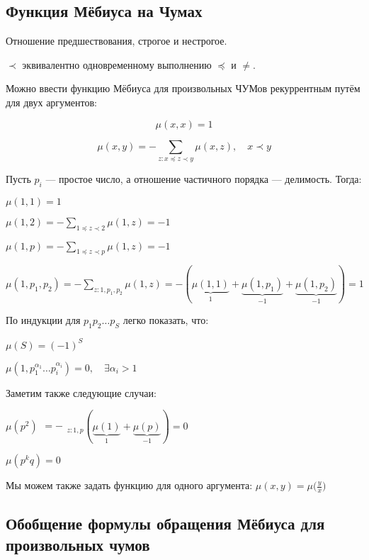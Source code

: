 \subsection{Функция Мёбиуса на Чумах}

\begin{rem} Отношение предшествования, строгое и нестрогое.

$ \prec $ эквивалентно одновременному выполнению $\preceq $ и $\neq $.
\end{rem}

Можно ввести функцию Мёбиуса для произвольных ЧУМов рекуррентным путём для двух аргументов:
 


\[
\mu(x,x) = 1 \]

\[
\mu(x,y) = - \sum \limits _{
z: x \preceq
z \prec 
y
} \mu(x,z), \quad x \prec y 
\]
 
Пусть $ p_i $ --- простое число, а отношение частичного порядка --- делимость. Тогда:

$
\mu(1,1) = 1
$

$
\displaystyle \mu(1,2) = -\sum \limits _{1 \preceq z \prec 2} \mu(1,z) = -1
$

$\displaystyle
\mu(1,p) =  -\sum \limits _{1 \preceq z \prec p} \mu(1,z) = -1
$
 
 

$\displaystyle
 \mu(1,p_1, p_2) = -\sum \limits _{z: 1, p_1, p_2} \mu(1,z)  =
- ( 
\underbrace {
\mu (1,1) 
} _{1}
+
\underbrace {
 \mu(1,p_1) 
} _{-1}
+
\underbrace{
 \mu (1, p_2)
} _{-1} 
) 
= 1
$

По индукции для $ p_1 p_2 \dots p_S $ легко показать, что: 

$
\mu(S) = (-1)^S
$

$
\mu(1,p_1^{\alpha_1} \dots p_i^{\alpha_i} ) = 0 , \quad \exists \alpha_i > 1
$

Заметим также следующие случаи:

$
\mu(p^2) \substack {= -} _{z: 1,p} (
\underbrace{
	\mu(1)
} _{1}
 + 
\underbrace{
 \mu(p)
 }
 _{-1
 }
 )  = 0
$

$
\mu(p^k q) = 0
$ 

\begin{rem}
Мы можем также задать функцию для одного аргумента: $\displaystyle \mu(x,y) = \mu\bigg(\frac y x\bigg)$
\end{rem}
 


\subsection{Обобщение формулы обращения Мёбиуса для произвольных чумов}

